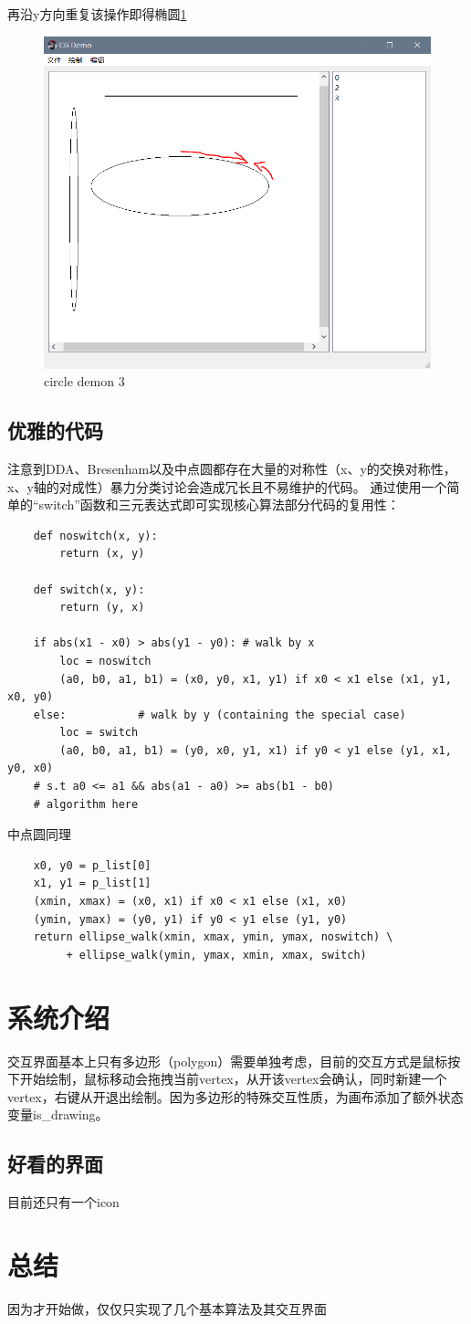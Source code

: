 \documentclass[a4paper,UTF8]{article}
\theoremstyle{definition}
\begin{document}
再沿y方向重复该操作即得椭圆\ref{fig6}
\begin{figure}
    \centering
    \includegraphics[width = .5\textwidth]{source/pics/circle_demon3.PNG}
    \caption{circle demon 3}
    \label{fig6}
\end{figure}

\subsection{优雅的代码}
注意到DDA、Bresenham以及中点圆都存在大量的对称性（x、y的交换对称性，x、y轴的对成性）暴力分类讨论会造成冗长且不易维护的代码。
通过使用一个简单的“switch”函数和三元表达式即可实现核心算法部分代码的复用性：
\begin{lstlisting}
    def noswitch(x, y):
        return (x, y)

    def switch(x, y):
        return (y, x)

    if abs(x1 - x0) > abs(y1 - y0): # walk by x
        loc = noswitch
        (a0, b0, a1, b1) = (x0, y0, x1, y1) if x0 < x1 else (x1, y1, x0, y0)
    else:           # walk by y (containing the special case)
        loc = switch
        (a0, b0, a1, b1) = (y0, x0, y1, x1) if y0 < y1 else (y1, x1, y0, x0)
    # s.t a0 <= a1 && abs(a1 - a0) >= abs(b1 - b0)
    # algorithm here
\end{lstlisting}

\par
中点圆同理
\begin{lstlisting}
    x0, y0 = p_list[0]
    x1, y1 = p_list[1]
    (xmin, xmax) = (x0, x1) if x0 < x1 else (x1, x0)
    (ymin, ymax) = (y0, y1) if y0 < y1 else (y1, y0)
    return ellipse_walk(xmin, xmax, ymin, ymax, noswitch) \
         + ellipse_walk(ymin, ymax, xmin, xmax, switch)
\end{lstlisting}

		
\section{系统介绍}
交互界面基本上只有多边形（polygon）需要单独考虑，目前的交互方式是鼠标按下开始绘制，鼠标移动会拖拽当前vertex，从开该vertex会确认，同时新建一个vertex，右键从开退出绘制。因为多边形的特殊交互性质，为画布添加了额外状态变量is\_drawing。

\subsection{好看的界面}
目前还只有一个icon

\section{总结}
因为才开始做，仅仅只实现了几个基本算法及其交互界面

%

\end{document}
